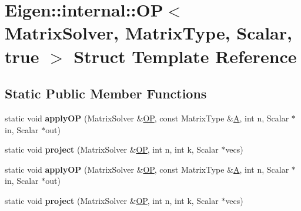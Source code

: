 \hypertarget{struct_eigen_1_1internal_1_1_o_p_3_01_matrix_solver_00_01_matrix_type_00_01_scalar_00_01true_01_4}{}\section{Eigen\+:\+:internal\+:\+:OP$<$ Matrix\+Solver, Matrix\+Type, Scalar, true $>$ Struct Template Reference}
\label{struct_eigen_1_1internal_1_1_o_p_3_01_matrix_solver_00_01_matrix_type_00_01_scalar_00_01true_01_4}
\subsection*{Static Public Member Functions}
\begin{DoxyCompactItemize}
\item 
\mbox{\label{struct_eigen_1_1internal_1_1_o_p_3_01_matrix_solver_00_01_matrix_type_00_01_scalar_00_01true_01_4_aa9e415926754fb7a987b8b8a6a985446}} 
static void {\bfseries apply\+OP} (Matrix\+Solver \&\hyperlink{struct_eigen_1_1internal_1_1_o_p}{OP}, const Matrix\+Type \&\hyperlink{group___core___module_class_eigen_1_1_matrix}{A}, int n, Scalar $\ast$in, Scalar $\ast$out)
\item 
\mbox{\label{struct_eigen_1_1internal_1_1_o_p_3_01_matrix_solver_00_01_matrix_type_00_01_scalar_00_01true_01_4_ad5dffc4670a49260f7e0d52643381bbc}} 
static void {\bfseries project} (Matrix\+Solver \&\hyperlink{struct_eigen_1_1internal_1_1_o_p}{OP}, int n, int k, Scalar $\ast$vecs)
\item 
\mbox{\label{struct_eigen_1_1internal_1_1_o_p_3_01_matrix_solver_00_01_matrix_type_00_01_scalar_00_01true_01_4_aa9e415926754fb7a987b8b8a6a985446}} 
static void {\bfseries apply\+OP} (Matrix\+Solver \&\hyperlink{struct_eigen_1_1internal_1_1_o_p}{OP}, const Matrix\+Type \&\hyperlink{group___core___module_class_eigen_1_1_matrix}{A}, int n, Scalar $\ast$in, Scalar $\ast$out)
\item 
\mbox{\label{struct_eigen_1_1internal_1_1_o_p_3_01_matrix_solver_00_01_matrix_type_00_01_scalar_00_01true_01_4_ad5dffc4670a49260f7e0d52643381bbc}} 
static void {\bfseries project} (Matrix\+Solver \&\hyperlink{struct_eigen_1_1internal_1_1_o_p}{OP}, int n, int k, Scalar $\ast$vecs)
\end{DoxyCompactItemize}


